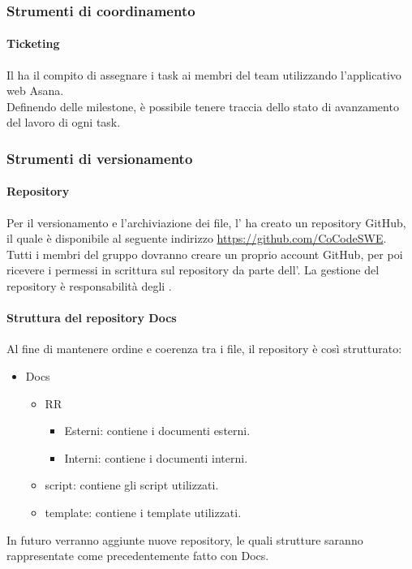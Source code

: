 \subsubsection{Strumenti di coordinamento}
 \paragraph{Ticketing}
 Il \RESP{} ha il compito di assegnare i task ai membri del team utilizzando l'applicativo web Asana. \\
 Definendo delle milestone, è possibile tenere traccia dello stato di avanzamento del lavoro di ogni task.
 
\subsubsection{Strumenti di versionamento}
 \paragraph{Repository}
 Per il versionamento e l'archiviazione dei file, l'\AMM{} ha creato un repository GitHub, il quale è disponibile al seguente indirizzo \url{https://github.com/CoCodeSWE}. Tutti i membri del gruppo dovranno creare un proprio account GitHub, per poi ricevere i permessi in scrittura sul repository da parte dell'\AMM.
 La gestione del repository è responsabilità degli \AMMP.
 \paragraph{Struttura del repository Docs}
 Al fine di mantenere ordine e coerenza tra i file, il repository è così strutturato:
 \begin{itemize}
  \item Docs
   \begin{itemize}
    \item RR
     \begin{itemize}
      \item Esterni: contiene i documenti esterni.
      \item Interni: contiene i documenti interni.
     \end{itemize}
     \item script: contiene gli script utilizzati.
     \item template: contiene i template utilizzati.
    \end{itemize}
   \end{itemize}
In futuro verranno aggiunte nuove repository, le quali strutture saranno rappresentate come precedentemente fatto con Docs.
